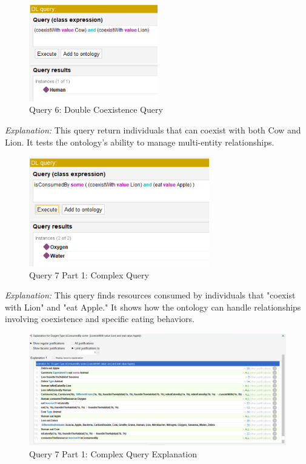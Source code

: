 \begin{figure}[H]
  \centering
  \includegraphics[width=0.5\textwidth]{DL queries images/1-coexistance double.png}
  \caption{Query 6: Double Coexistence Query}
  \label{fig:query6}
\end{figure}

\textit{Explanation:} This query return individuals that can coexist with both Cow and Lion. It tests the ontology’s ability to manage multi-entity relationships.

\begin{figure}[H]
  \centering
      \includegraphics[width=0.7\textwidth]{DL queries images/4-query dure .png}
      \caption{Query 7 Part 1: Complex Query}
      \label{fig:query7b}
\end{figure}

\textit{Explanation:} This query finds resources consumed by individuals that "coexist with Lion" and "eat Apple." It shows how the ontology can handle relationships involving coexistence and specific eating behaviors.

\begin{figure}[H]
  \centering
      \includegraphics[width=1\textwidth]{DL queries images/3-explication query dure.png}
      \caption{Query 7 Part 1: Complex Query Explanation}
      \label{fig:query7a}
\end{figure}


